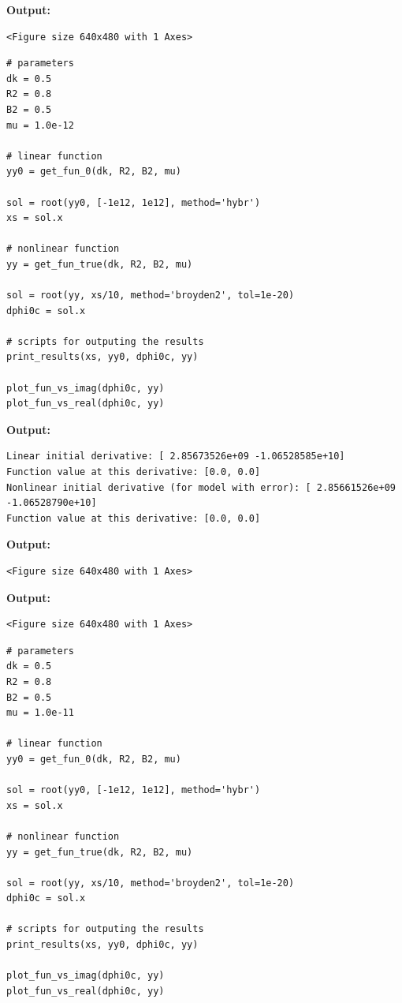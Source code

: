 \documentclass{article}
\begin{document}
\textbf{Output:}\begin{verbatim}
<Figure size 640x480 with 1 Axes>
\end{verbatim}

\begin{lstlisting}
# parameters
dk = 0.5
R2 = 0.8
B2 = 0.5
mu = 1.0e-12

# linear function
yy0 = get_fun_0(dk, R2, B2, mu)

sol = root(yy0, [-1e12, 1e12], method='hybr')
xs = sol.x

# nonlinear function
yy = get_fun_true(dk, R2, B2, mu)

sol = root(yy, xs/10, method='broyden2', tol=1e-20)
dphi0c = sol.x

# scripts for outputing the results
print_results(xs, yy0, dphi0c, yy)

plot_fun_vs_imag(dphi0c, yy)
plot_fun_vs_real(dphi0c, yy)\end{lstlisting}

\textbf{Output:}\begin{verbatim}
Linear initial derivative: [ 2.85673526e+09 -1.06528585e+10]
Function value at this derivative: [0.0, 0.0]
Nonlinear initial derivative (for model with error): [ 2.85661526e+09 -1.06528790e+10]
Function value at this derivative: [0.0, 0.0]

\end{verbatim}

\textbf{Output:}\begin{verbatim}
<Figure size 640x480 with 1 Axes>
\end{verbatim}

\textbf{Output:}\begin{verbatim}
<Figure size 640x480 with 1 Axes>
\end{verbatim}

\begin{lstlisting}
# parameters
dk = 0.5
R2 = 0.8
B2 = 0.5
mu = 1.0e-11

# linear function
yy0 = get_fun_0(dk, R2, B2, mu)

sol = root(yy0, [-1e12, 1e12], method='hybr')
xs = sol.x

# nonlinear function
yy = get_fun_true(dk, R2, B2, mu)

sol = root(yy, xs/10, method='broyden2', tol=1e-20)
dphi0c = sol.x

# scripts for outputing the results
print_results(xs, yy0, dphi0c, yy)

plot_fun_vs_imag(dphi0c, yy)
plot_fun_vs_real(dphi0c, yy)\end{lstlisting}
\end{document}
